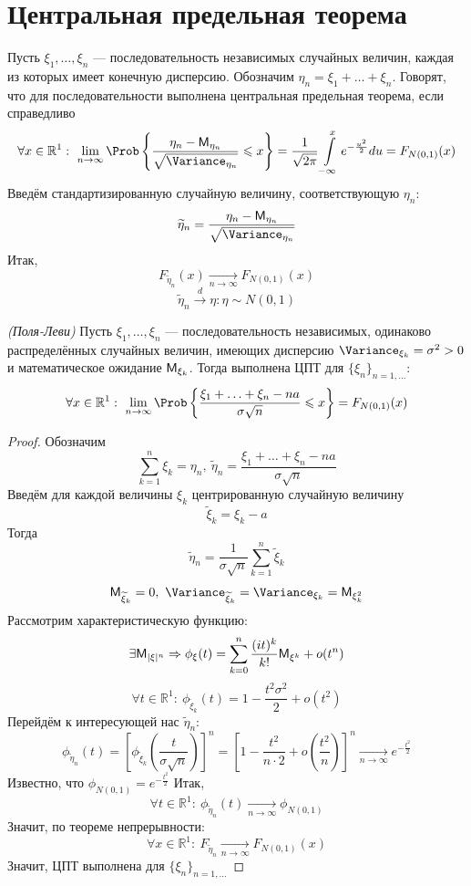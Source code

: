 \section{Центральная предельная теорема}
Пусть $\xi_1, \ldots, \xi_n$ --- последовательность независимых случайных величин, каждая из которых имеет конечную дисперсию. Обозначим $\eta_n = \xi_1 + \ldots + \xi_n$. Говорят, что для последовательности выполнена центральная предельная теорема, если справедливо
\[
	\forall x \in \mathbb{R}^1: \ \lim\limits_{n \to \infty} \Prob \left\{ \frac{\eta_n - \MExpect_{\eta_n}}{\sqrt{\Variance_{\eta_n}}} \leqslant x \right\} = \frac{1}{\sqrt{2 \pi}} \int\limits_{-\infty}^{x} e^{- \frac{u^2}{2}} du = F_{N(0,1)} (x)
\]
Введём стандартизированную случайную величину, соответствующую $\eta_n$:
\[
	\widetilde{\eta}_n = \frac{\eta_n - \MExpect_{\eta_n}}{\sqrt{\Variance_{\eta_n}}}
\]
Итак,
\[
	F_{\widetilde{\eta}_n} (x) \underset{n \to \infty}{\rightarrow} F_{N(0, 1)} (x)
\]
\[
	\widetilde{\eta}_n \overset{d}{\rightarrow} \eta: \eta \sim N(0, 1)
\]
\begin{theorem}
	\textit{(Поля-Леви)} Пусть $\xi_1, \ldots, \xi_n$ --- последовательность независимых, одинаково распределённых случайных величин, имеющих дисперсию $\Variance_{\xi_k} = \sigma^2 > 0$ и математическое ожидание $\mathsf{M}_{\xi_k}$. Тогда выполнена ЦПТ для $\{ \xi_n \}_{n = 1, \ldots}$:
\[
	\forall x \in \mathbb{R}^1: \ \lim\limits_{n \to \infty} \Prob \left\{ \frac{\xi_1 + \ldots + \xi_n - na}{\sigma \sqrt{n}} \leqslant x \right\} = F_{N(0, 1)} (x)
\]
\end{theorem}
\begin{proof}
	Обозначим
	\[
		\sum\limits_{k = 1}^{n} \xi_k = \eta_n, \ \widetilde{\eta}_n = \frac{\xi_1 + \ldots + \xi_n - na}{\sigma \sqrt{n}} 
	\]
	Введём для каждой величины $\xi_k$ центрированную случайную величину
	\[
		\widetilde{\xi}_k = \xi_k - a
	\]
	Тогда
	\[
		\widetilde{\eta}_n = \frac{1}{\sigma \sqrt{n}} \sum\limits_{k = 1}^{n} \widetilde{\xi}_k
	\]
	\[
		\MExpect_{\widetilde{\xi}_k} = 0, \ \Variance_{\widetilde{\xi}_k} = \Variance_{\xi_k} = \MExpect_{\xi_k^2}
	\]
	Рассмотрим характеристическую функцию:
	\[
		\exists \mathsf{M}_{|\xi|^n} \Rightarrow \phi_{\xi} (t) = \sum\limits_{k = 0}^{n} \frac{(it)^k}{k!} \mathsf{M}_{\xi^k} + o(t^n)
	\]
	\[
		\forall t \in \mathbb{R}^1: \ \phi_{{\widetilde{\xi}_k}} (t) = 1 - \frac{t^2 \sigma^2}{2} + o(t^2)
	\]
	Перейдём к интересующей нас $\widetilde{\eta}_n$:
	\[
		\phi_{\widetilde{\eta}_n} (t) = \left[ \phi_{\widetilde{\xi}_k} \left( \frac{t}{\sigma \sqrt{n}} \right) \right]^n = \left[ 1 - \frac{t^2}{n \cdot 2} + o \left( \frac{t^2}{n} \right) \right]^n \underset{n \to \infty}{\rightarrow} e^{- \frac{t^2}{2}}
	\]
	Известно, что $\phi_{N(0, 1)} = e^{- \frac{t^2}{2}}$
	Итак,
	\[
		\forall t \in \mathbb{R}^1: \ \phi_{\widetilde{\eta}_n} (t) \underset{n \to \infty}{\rightarrow} \phi_{N(0, 1)}
	\]
	Значит, по теореме непрерывности:
	\[
		\forall x \in \mathbb{R}^1: \ F_{\widetilde{\eta}_n} \underset{n \to \infty}{\rightarrow} F_{N(0, 1)} (x)
	\]
	Значит, ЦПТ выполнена для $\{ \xi_n \}_{n = 1, \ldots}$
\end{proof}
